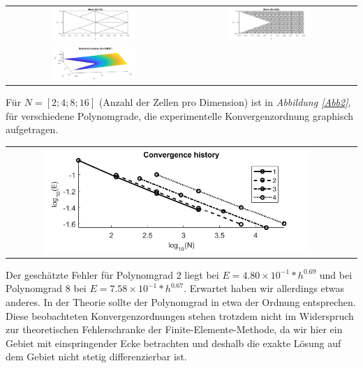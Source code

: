 \documentclass[11pt,a4paper]{article}
\begin{document}
  \begin{center}
  \begin{tabular}{cc}
  \includegraphics[width=0.5\textwidth]{Gitter2}&
  \includegraphics[width=0.5\textwidth]{Gitter1}\\ 
  \includegraphics[width=0.5\textwidth]{Loesung}
   \end{tabular}
  \label{Abb1}
  \end{center}

  Für $N=[2;4;8;16]$ (Anzahl der Zellen pro Dimension) ist in \textit{Abbildung \ref{Abb2}}, für verschiedene Polynomgrade, die experimentelle Konvergenzordnung graphisch aufgetragen.
   \begin{center}
  \begin{tabular}{cc}
  \includegraphics[width=0.8\textwidth]{konv}
   \end{tabular}
  \label{Abb2}
  \end{center}
  
  Der geschätzte Fehler für Polynomgrad $2$ liegt bei $ E = 4.80\times 10^{-1} * h^{ 0.69}$ und bei Polynomgrad $8$ bei $E = 7.58\times 10^{-1} * h^{ 0.67}$. Erwartet haben wir allerdings etwas anderes. In der Theorie sollte der Polynomgrad in etwa der Ordnung entsprechen. Diese beobachteten Konvergenzordnungen stehen trotzdem nicht im Widerspruch zur theoretischen Fehlerschranke der Finite-Elemente-Methode, da wir hier ein Gebiet mit einspringender Ecke betrachten und deshalb die exakte Lösung auf dem Gebiet nicht stetig differenzierbar ist. \\ 
\end{document}
